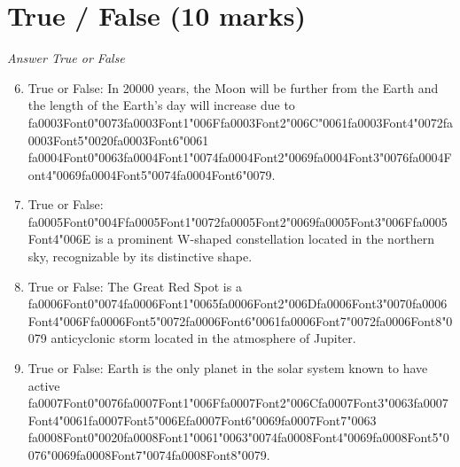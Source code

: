 \documentclass[12pt]{article}
\begin{document}
\section*{True / False (10 marks)}
\textit{Answer True or False}
\begin{enumerate}[label=\arabic*.]
\setcounter{enumi}{5}
\item True or False: In 20000 years, the Moon will be further from the Earth and the length of the Earth's day will increase due to {\csname fa0003Font0\endcsname\char"0073}{\csname fa0003Font1\endcsname\char"006F}{\csname fa0003Font2\endcsname\char"006C}{\char"0061}{\csname fa0003Font4\endcsname\char"0072}{\csname fa0003Font5\endcsname\char"0020}{\csname fa0003Font6\endcsname\char"0061} {\csname fa0004Font0\endcsname\char"0063}{\csname fa0004Font1\endcsname\char"0074}{\csname fa0004Font2\endcsname\char"0069}{\csname fa0004Font3\endcsname\char"0076}{\csname fa0004Font4\endcsname\char"0069}{\csname fa0004Font5\endcsname\char"0074}{\csname fa0004Font6\endcsname\char"0079}.
\item True or False: {\csname fa0005Font0\endcsname\char"004F}{\csname fa0005Font1\endcsname\char"0072}{\csname fa0005Font2\endcsname\char"0069}{\csname fa0005Font3\endcsname\char"006F}{\csname fa0005Font4\endcsname\char"006E} is a prominent W-shaped constellation located in the northern sky, recognizable by its distinctive shape.
\item True or False: The Great Red Spot is a {\csname fa0006Font0\endcsname\char"0074}{\csname fa0006Font1\endcsname\char"0065}{\csname fa0006Font2\endcsname\char"006D}{\csname fa0006Font3\endcsname\char"0070}{\csname fa0006Font4\endcsname\char"006F}{\csname fa0006Font5\endcsname\char"0072}{\csname fa0006Font6\endcsname\char"0061}{\csname fa0006Font7\endcsname\char"0072}{\csname fa0006Font8\endcsname\char"0079} anticyclonic storm located in the atmosphere of Jupiter.
\item True or False: Earth is the only planet in the solar system known to have active {\csname fa0007Font0\endcsname\char"0076}{\csname fa0007Font1\endcsname\char"006F}{\csname fa0007Font2\endcsname\char"006C}{\csname fa0007Font3\endcsname\char"0063}{\csname fa0007Font4\endcsname\char"0061}{\csname fa0007Font5\endcsname\char"006E}{\csname fa0007Font6\endcsname\char"0069}{\csname fa0007Font7\endcsname\char"0063} {\csname fa0008Font0\endcsname\char"0020}{\csname fa0008Font1\endcsname\char"0061}{\char"0063}{\char"0074}{\csname fa0008Font4\endcsname\char"0069}{\csname fa0008Font5\endcsname\char"0076}{\char"0069}{\csname fa0008Font7\endcsname\char"0074}{\csname fa0008Font8\endcsname\char"0079}.

\end{enumerate}
\end{document}
